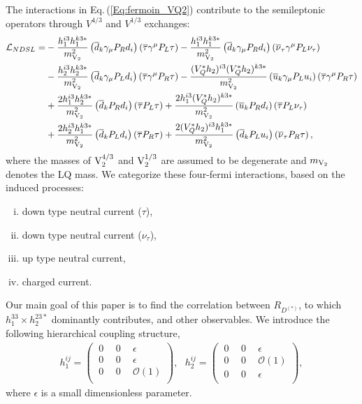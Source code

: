 \documentclass[12pt, a4paper]{article}
\numberwithin{equation}{section} %
\newcommand{\ov}{\overline}
\newcommand{\1}{\mbox{1}\hspace{-0.25em}\mbox{l}}
\begin{document}
The interactions in Eq.\,(\ref{Eq:fermoin_VQ2}) contribute to the semileptonic operators through $V^{4/3}$ and $V^{1/3}$ exchanges:
\begin{align}
{\mathcal L}_{NDSL}=&-\frac{h_1^{i3}h_1^{k3*} }{m_{\rm{V}_2}^2} \left(\ov{d}_k \gamma_\mu P_R d_i\right) \left(\ov{\tau} \gamma^\mu P_L \tau \right) 
    -\frac{h_1^{i3}h_1^{k3*} }{m_{\rm{V}_2}^2} \left(\ov{d}_k \gamma_\mu P_R d_i\right) \left(\ov{\nu}_\tau \gamma^\mu P_L \nu_\tau \right) \nonumber\\
    &-\frac{h_2^{i3}h_2^{k3*} }{m_{\rm{V}_2}^2} \left(\ov{d}_k \gamma_\mu P_L d_i\right) \left(\ov{\tau} \gamma^\mu P_R \tau \right) 
    -\frac{(V_Q^* h_2)^{i3}(V_Q^* h_2)^{k3*} }{m_{\rm{V}_2}^2} \left(\ov{u}_k \gamma_\mu P_L u_i\right) \left(\ov{\tau} \gamma^\mu P_R \tau \right) \nonumber\\
    &+\frac{2h_1^{i3}h_2^{k3*} }{m_{\rm{V}_2}^2} \left(\ov{d}_k  P_R d_i\right) \left(\ov{\tau} P_L \tau \right) 
    +\frac{2h_1^{i3}(V_Q^* h_2)^{k3*} }{m_{\rm{V}_2}^2} \left(\ov{u}_k  P_R d_i\right) \left(\ov{\tau} P_L \nu_\tau \right)  \nonumber\\
    &+\frac{2h_2^{i3}h_1^{k3*} }{m_{\rm{V}_2}^2} \left(\ov{d}_k  P_L d_i\right) \left(\ov{\tau} P_R \tau \right) 
    +\frac{2(V_Q^* h_2)^{i3}h_1^{k3*} }{m_{\rm{V}_2}^2} \left(\ov{d}_k  P_L u_i\right) \left(\ov{\nu}_\tau P_R \tau \right),
    \label{EQ:NDSL}
\end{align}
where the masses of $\rm{V}_2^{4/3}$ and $\rm{V}_2^{1/3}$ are assumed to be degenerate and $m_{\rm{V}_2}$ denotes the LQ mass.
We categorize these four-fermi interactions, based on the induced processes:
\begin{enumerate}[(i)]
\item down type neutral current ($\tau$),
\item down type neutral current ($\nu_\tau$),
\item up type neutral current,
\item charged current.
\end{enumerate}
Our main goal of this paper is to find the correlation between $R_{D^{(*)}}$, to which $h_1^{33}\times h_2^{23*}$ dominantly contributes, and other observables.
We introduce the following hierarchical coupling structure,
\begin{eqnarray}
  h_1^{ij} =\left(
  \begin{array}{ccc}
   ~0~&~0~&~\epsilon\\
   ~0~&~0~&~\epsilon\\
   ~0~&~0~&~\mathcal{O}(1)\\
  \end{array}
  \right),~~~h_2^{ij} =\left(
  \begin{array}{ccc}
   ~0~&~0~&~\epsilon\\
   ~0~&~0~&~\mathcal{O}(1)\\
   ~0~&~0~&~\epsilon\\
  \end{array}
  \right),
\label{eq:coupling_structure_2}
\end{eqnarray}
where $\epsilon$ is a small dimensionless parameter.
\end{document}
